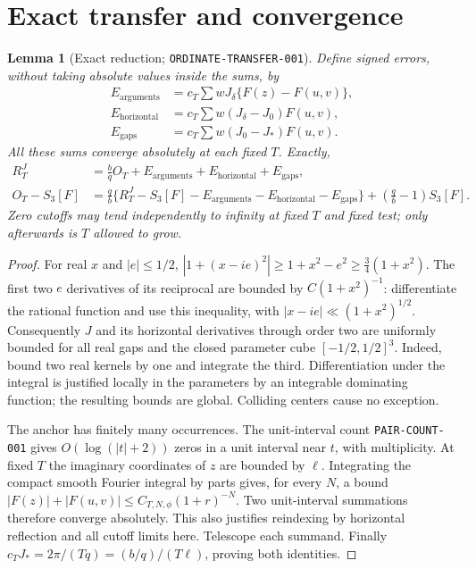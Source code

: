 \documentclass[11pt]{article}
\newtheorem{lemma}{Lemma}
\newcommand{\Ea}{E_{\mathrm{arguments}}}
\newcommand{\Eh}{E_{\mathrm{horizontal}}}
\newcommand{\Eg}{E_{\mathrm{gaps}}}
\begin{document}
\section{Exact transfer and convergence}
\begin{lemma}[Exact reduction; \texttt{ORDINATE-TRANSFER-001}]
\label{lem:transfer}
Define signed errors, without taking absolute values inside the sums, by
\begin{align}
 \Ea&=c_T\sum wJ_\delta\{F(z)-F(u,v)\},\label{eq:arguments}\\
 \Eh&=c_T\sum w(J_\delta-J_0)F(u,v),\label{eq:horizontal}\\
 \Eg&=c_T\sum w(J_0-J_*)F(u,v).\label{eq:gaps}
\end{align}
All these sums converge absolutely at each fixed $T$. Exactly,
\begin{align}
 R_T^J&=\frac bq O_T+\Ea+\Eh+\Eg,\label{eq:transfer}\\
 O_T-S_3[F]&=\frac qb\{R_T^J-S_3[F]-\Ea-\Eh-\Eg\}
                   +\left(\frac qb-1\right)S_3[F].\label{eq:main-transfer}
\end{align}
Zero cutoffs may tend independently to infinity at fixed $T$ and fixed
test; only afterwards is $T$ allowed to grow.
\end{lemma}
\begin{proof}
For real $x$ and $|e|\leq1/2$,
$|1+(x-ie)^2|\geq1+x^2-e^2\geq\tfrac34(1+x^2)$.
The first two $e$ derivatives of its reciprocal are bounded by
$C(1+x^2)^{-1}$: differentiate the rational function and use this
inequality, with $|x-ie|\ll(1+x^2)^{1/2}$.
Consequently $J$ and its horizontal derivatives through order two are
uniformly bounded for all real gaps and the closed parameter cube
$[-1/2,1/2]^3$. Indeed, bound two real kernels by one and integrate the
third. Differentiation under the integral is justified locally in the
parameters by an integrable dominating function; the resulting bounds
are global. Colliding centers cause no exception.

The anchor has finitely many occurrences. The unit-interval count
\texttt{PAIR-COUNT-001} gives $O(\log(|t|+2))$ zeros in a unit interval
near $t$, with multiplicity. At fixed $T$ the imaginary coordinates
of $z$ are bounded by $\ell$. Integrating the compact smooth Fourier
integral by parts gives, for every $N$, a bound
$|F(z)|+|F(u,v)|\leq C_{T,N,\phi}(1+r)^{-N}$.
Two unit-interval summations therefore converge absolutely. This
also justifies reindexing by horizontal reflection and all cutoff
limits here. Telescope each summand. Finally
$c_TJ_*=2\pi/(Tq)=(b/q)/(T\ell)$, proving both identities.
\end{proof}
\end{document}
